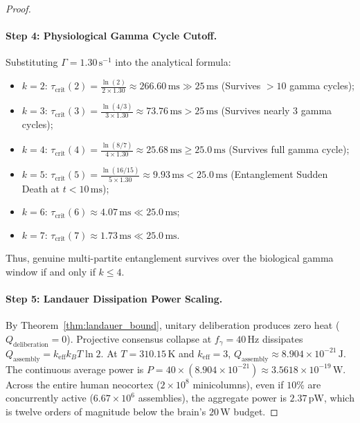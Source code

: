 \documentclass[10pt,twocolumn,3p]{article}
\begin{document}
\begin{proof}
\paragraph{Step 4: Physiological Gamma Cycle Cutoff.}
Substituting $\Gamma = 1.30\,\text{s}^{-1}$ into the analytical formula:
\begin{itemize}
    \item $k = 2$: $\tau_{\text{crit}}(2) = \frac{\ln(2)}{2 \times 1.30} \approx 266.60\,\text{ms} \gg 25\,\text{ms}$ (Survives $>10$ gamma cycles);
    \item $k = 3$: $\tau_{\text{crit}}(3) = \frac{\ln(4/3)}{3 \times 1.30} \approx 73.76\,\text{ms} > 25\,\text{ms}$ (Survives nearly 3 gamma cycles);
    \item $k = 4$: $\tau_{\text{crit}}(4) = \frac{\ln(8/7)}{4 \times 1.30} \approx 25.68\,\text{ms} \ge 25.0\,\text{ms}$ (Survives full gamma cycle);
    \item $k = 5$: $\tau_{\text{crit}}(5) = \frac{\ln(16/15)}{5 \times 1.30} \approx 9.93\,\text{ms} < 25.0\,\text{ms}$ (Entanglement Sudden Death at $t < 10\,\text{ms}$);
    \item $k = 6$: $\tau_{\text{crit}}(6) \approx 4.07\,\text{ms} \ll 25.0\,\text{ms}$;
    \item $k = 7$: $\tau_{\text{crit}}(7) \approx 1.73\,\text{ms} \ll 25.0\,\text{ms}$.
\end{itemize}
Thus, genuine multi-partite entanglement survives over the biological gamma window if and only if $k \le 4$.

\paragraph{Step 5: Landauer Dissipation Power Scaling.}
By Theorem~\ref{thm:landauer_bound}, unitary deliberation produces zero heat ($Q_{\text{deliberation}} = 0$). Projective consensus collapse at $f_\gamma = 40\,\text{Hz}$ dissipates $Q_{\text{assembly}} = k_{\text{eff}} k_B T \ln 2$. At $T = 310.15\,\text{K}$ and $k_{\text{eff}} = 3$, $Q_{\text{assembly}} \approx 8.904 \times 10^{-21}\,\text{J}$. The continuous average power is $P = 40 \times (8.904 \times 10^{-21}) \approx 3.5618 \times 10^{-19}\,\text{W}$. Across the entire human neocortex ($2 \times 10^8$ minicolumns), even if $10\%$ are concurrently active ($6.67 \times 10^6$ assemblies), the aggregate power is $2.37\,\text{pW}$, which is twelve orders of magnitude below the brain's $20\,\text{W}$ budget.
\end{proof}
\end{document}
